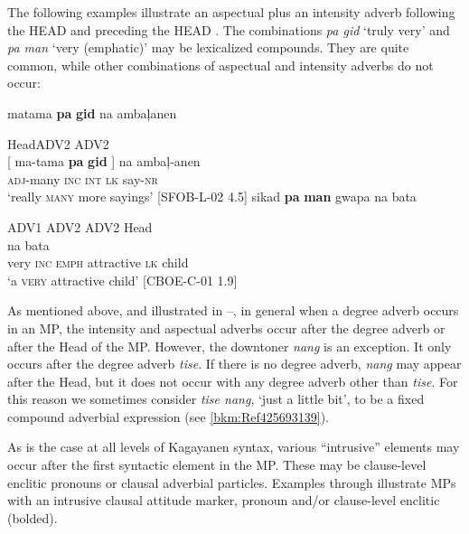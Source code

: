 The following examples illustrate an aspectual plus an intensity adverb following the HEAD  and preceding the HEAD . The combinations \textit{pa gid} ‘truly very’ and \textit{pa man} ‘very (emphatic)’ may be lexicalized compounds. They are quite common, while other combinations of aspectual and intensity adverbs do not occur:

\ea
\label{bkm:Ref424800529}
matama  \textbf{pa}  \textbf{gid}  na  ambaļanen \\\smallskip

\hspace{6pt}Head\hspace{18pt}ADV2  ADV2 \\
\gll {}[ ma-tama  \textbf{pa}  \textbf{gid} ]  na  ambaļ-anen \\
 {} \textsc{adj}-many  \textsc{inc}  \textsc{int} {} \textsc{lk}  say-\textsc{nr} \\
\glt ‘really \textsc{many} more sayings’ [SFOB-L-02 4.5]
\z
\ea
\label{bkm:Ref481481587}
sikad  \textbf{pa}  \textbf{man}  gwapa  na  bata \\\smallskip

ADV1 ADV2 ADV2 Head \\
  na  bata \\
{}  very  \textsc{inc}  \textsc{emph}  attractive {} \textsc{lk}  child \\
\glt ‘a \textsc{very} attractive child’ [CBOE-C-01 1.9]
\z

As mentioned above, and illustrated in --, in general when a degree adverb occurs in an MP, the intensity and aspectual adverbs occur after the degree adverb or after the Head of the MP. However, the downtoner \textit{nang} is an exception. It only occurs after the degree adverb \textit{tise}. If there is no degree adverb, \textit{nang} may appear after the Head, but it does not occur with any degree adverb other than \textit{tise}. For this reason we sometimes consider \textit{tise nang}, ‘just a little bit’, to be a fixed compound adverbial expression (see \ref{bkm:Ref425693139}).

As is the case at all levels of Kagayanen syntax, various “intrusive” elements may occur after the first syntactic element in the MP. These may be clause-level enclitic pronouns or clausal adverbial particles. Examples  through  illustrate MPs with an intrusive clausal attitude marker, pronoun and/or clause-level enclitic (bolded).


